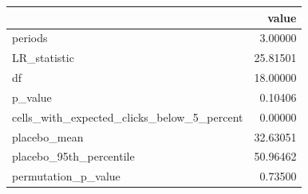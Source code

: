 \begin{tabular}{lr}
\toprule
 & value \\
\midrule
periods & 3.00000 \\
LR\_statistic & 25.81501 \\
df & 18.00000 \\
p\_value & 0.10406 \\
cells\_with\_expected\_clicks\_below\_5\_percent & 0.00000 \\
placebo\_mean & 32.63051 \\
placebo\_95th\_percentile & 50.96462 \\
permutation\_p\_value & 0.73500 \\
\bottomrule
\end{tabular}
